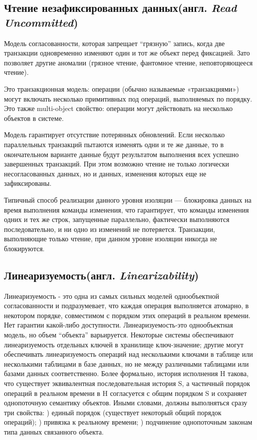 \documentclass[12pt,  openany]{book}
\begin{document}
\subsection{Чтение незафиксированных данных(англ.  \textit{Read Uncommitted})}
Модель согласованности, которая запрещает “грязную” запись, когда две транзакции одновременно изменяют один и тот же объект перед фиксацией. Зато позволяет другие аномалии (грязное чтение, фантомное чтение, неповторяющееся чтение). 
\par
Это транзакционная модель: операции (обычно называемые «транзакциями») могут включать несколько примитивных под операций, выполняемых по порядку. Это также multi-object свойство: операции могут действовать на несколько объектов в системе.
\par
Модель гарантирует отсутствие потерянных обновлений. Если несколько параллельных транзакций пытаются изменять одни и те же данные, то в окончательном варианте данные  будут результатом выполнения всех успешно завершенных транзакций. При этом возможно чтение не только логически несогласованных данных, но и данных, изменения которых еще не зафиксированы.
\par
Типичный способ реализации данного уровня изоляции — блокировка данных на время выполнения команды изменения, что гарантирует, что команды изменения одних и тех же строк, запущенные параллельно, фактически выполняются последовательно, и ни одно из изменений не потеряется. Транзакции, выполняющие только чтение, при данном уровне изоляции никогда не блокируются.

\subsection{Линеаризуемость(англ.  \textit{Linearizability})}
Линеаризуемость - это одна из самых сильных моделей однообъектной согласованности и подразумевает, что каждая операция выполняется атомарно, в некотором порядке, совместимом с порядком этих операций в реальном времени. 
Нет гарантии какой-либо доступности.
Линеаризуемость-это однообъектная модель, но объем “объекта” варьируется. Некоторые системы обеспечивают линеаризуемость отдельных ключей в хранилище ключ-значение; другие могут обеспечивать линеаризуемость операций над несколькими ключами в таблице или несколькими таблицами в базе данных, но не между различными таблицами или базами данных соответственно.
Более формально, история исполнения H такова, что существует эквивалентная последовательная история S, а частичный порядок операций в реальном времени в H согласуется с общим порядком S и сохраняет однопоточную семантику объектов.
Иными словами, должны выполняться сразу три свойства: ) единый порядок (существует некоторый общий порядок операций); ) привязка к реальному времени; ) подчинение однопоточным законам типа данных связанного объекта.
\end{document}
